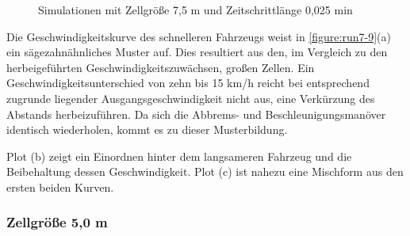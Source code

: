 \begin{figure}[hptb]
  \centering 
   \qquad 
   \qquad 
  \caption{Simulationen mit Zellgröße 7,5 m und Zeitschrittlänge 0,025 min} 
  \label{figure:run7-8}
\end{figure}

Die Geschwindigkeitskurve des schnelleren Fahrzeugs weist in \cref{figure:run7-9}(a) ein sägezahnähnliches Muster auf.
Dies resultiert aus den, im Vergleich zu den herbeigeführten Geschwindigkeitszuwächsen, großen Zellen.
Ein Geschwindigkeitsunterschied von zehn bis 15 km/h reicht bei entsprechend zugrunde liegender Ausgangsgeschwindigkeit nicht aus, eine Verkürzung des Abstands herbeizuführen.
Da sich die Abbrems- und Beschleunigungsmanöver identisch wiederholen, kommt es zu dieser Musterbildung.

Plot (b) zeigt ein Einordnen hinter dem langsameren Fahrzeug und die Beibehaltung dessen Geschwindigkeit.
Plot (c) ist nahezu eine Mischform aus den ersten beiden Kurven.

\subsubsection{Zellgröße 5,0 m}

%





